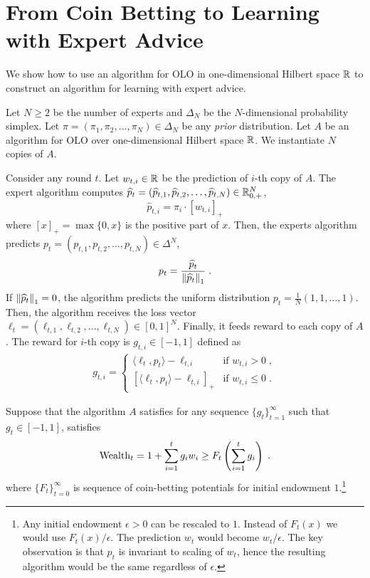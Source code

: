 \section{From Coin Betting to Learning with Expert Advice}
\label{section:reduction-experts}

We show how to use an algorithm for OLO in one-dimensional Hilbert space $\mathbb{R}$
to construct an algorithm for learning with expert advice.

Let $N \ge 2$ be the number of experts and $\Delta_N$ be the $N$-dimensional
probability simplex. Let $\pi = (\pi_1, \pi_2, \dots, \pi_N) \in \Delta_N$ be
any \emph{prior} distribution. Let $A$ be an algorithm for OLO over
one-dimensional Hilbert space $\mathbb{R}$. We instantiate $N$ copies of $A$.

Consider any round $t$. Let $w_{t,i} \in \mathbb{R}$ be the prediction of $i$-th copy of
$A$. The expert algorithm computes $\widehat p_t = (\widehat p_{t,1}, \widehat
p_{t,2}, \dots, \widehat p_{t,N}) \in \mathbb{R}_{0,+}^N$,
$$
\widehat p_{t,i} = \pi_i \cdot [w_{t,i}]_+
$$
where $[x]_+ = \max\{0,x\}$ is the positive part of $x$. Then, the experts
algorithm predicts $p_t = (p_{t,1}, p_{t,2}, \dots, p_{t,N}) \in \Delta^N$,
$$
p_t = \frac{\widehat p_t}{\left\|{\widehat p_t}\right\|_1} \; .
$$
If $\left\|{\widehat p_t}\right\|_1 = 0$, the algorithm predicts the uniform distribution
$p_t = \frac{1}{N}(1,1,\dots,1)$. Then, the algorithm receives the loss vector
$\ell_t = (\ell_{t,1}, \ell_{t,2}, \dots, \ell_{t,N}) \in [0,1]^N$. Finally, it
feeds reward to each copy of $A$. The reward for $i$-th copy is $g_{t,i} \in
[-1,1]$ defined as
\begin{align}
g_{t,i} =
\begin{cases}
\langle \ell_t, p_t \rangle - \ell_{t,i} & \text{if } w_{t,i} > 0 \; , \\
\left[\langle \ell_t, p_t \rangle - \ell_{t,i} \right]_+ & \text{if } w_{t,i} \le 0 \; .
\end{cases}
\end{align}

Suppose that the algorithm $A$ satisfies for any sequence
$\{g_t\}_{t=1}^\infty$ such that $g_t \in [-1,1]$, satisfies
\begin{equation}
\label{equation:experts-one-dimensional-assumption}
\operatorname{Wealth}_t = 1 + \sum_{i=1}^t g_i w_i \ge F_t\left(\sum_{i=1}^t g_i\right) \; .
\end{equation}
where $\{F_t\}_{t=0}^\infty$ is sequence of coin-betting potentials for initial
endowment $1$.\footnote{Any initial endowment $\epsilon > 0$ can be rescaled to
$1$. Instead of $F_t(x)$ we would use $F_t(x)/\epsilon$. The prediction $w_t$
would become $w_t/\epsilon$. The key observation is that $p_t$ is invariant to
scaling of $w_t$, hence the resulting algorithm would be the same regardless of $\epsilon$.}

